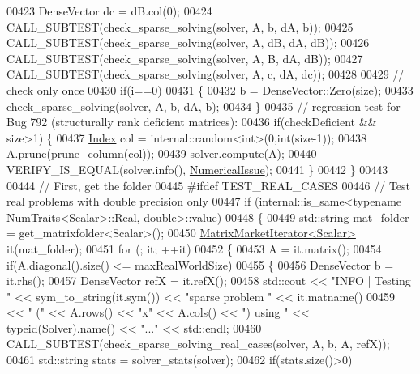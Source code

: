 \begin{DoxyCode}
00423     DenseVector dc = dB.col(0);
00424     CALL\_SUBTEST(check\_sparse\_solving(solver, A, b,  dA, b));
00425     CALL\_SUBTEST(check\_sparse\_solving(solver, A, dB, dA, dB));
00426     CALL\_SUBTEST(check\_sparse\_solving(solver, A, B,  dA, dB));
00427     CALL\_SUBTEST(check\_sparse\_solving(solver, A, c,  dA, dc));
00428     
00429     \textcolor{comment}{// check only once}
00430     \textcolor{keywordflow}{if}(i==0)
00431     \{
00432       b = DenseVector::Zero(size);
00433       check\_sparse\_solving(solver, A, b, dA, b);
00434     \}
00435     \textcolor{comment}{// regression test for Bug 792 (structurally rank deficient matrices):}
00436     \textcolor{keywordflow}{if}(checkDeficient && size>1) \{
00437       \hyperlink{namespace_eigen_a62e77e0933482dafde8fe197d9a2cfde}{Index} col = internal::random<int>(0,int(size-1));
00438       A.prune(\hyperlink{structprune__column}{prune\_column}(col));
00439       solver.compute(A);
00440       VERIFY\_IS\_EQUAL(solver.info(), \hyperlink{group__enums_gga85fad7b87587764e5cf6b513a9e0ee5eaaf9b736d310a664e7729d163a035cc5f}{NumericalIssue});
00441     \}
00442   \}
00443   
00444   \textcolor{comment}{// First, get the folder }
00445 \textcolor{preprocessor}{#ifdef TEST\_REAL\_CASES}
00446   \textcolor{comment}{// Test real problems with double precision only}
00447   \textcolor{keywordflow}{if} (internal::is\_same<\textcolor{keyword}{typename} \hyperlink{group___core___module_struct_eigen_1_1_num_traits}{NumTraits<Scalar>::Real}, \textcolor{keywordtype}{double}>::value)
00448   \{
00449     std::string mat\_folder = get\_matrixfolder<Scalar>();
00450     \hyperlink{class_eigen_1_1_matrix_market_iterator}{MatrixMarketIterator<Scalar>} it(mat\_folder);
00451     \textcolor{keywordflow}{for} (; it; ++it)
00452     \{
00453       A = it.matrix();
00454       \textcolor{keywordflow}{if}(A.diagonal().size() <= maxRealWorldSize)
00455       \{
00456         DenseVector b = it.rhs();
00457         DenseVector refX = it.refX();
00458         std::cout << \textcolor{stringliteral}{"INFO | Testing "} << sym\_to\_string(it.sym()) << \textcolor{stringliteral}{"sparse problem "} << it.matname()
00459                   << \textcolor{stringliteral}{" ("} << A.rows() << \textcolor{stringliteral}{"x"} << A.cols() << \textcolor{stringliteral}{") using "} << \textcolor{keyword}{typeid}(Solver).name() << \textcolor{stringliteral}{"..."} <<
       std::endl;
00460         CALL\_SUBTEST(check\_sparse\_solving\_real\_cases(solver, A, b, A, refX));
00461         std::string stats = solver\_stats(solver);
00462         \textcolor{keywordflow}{if}(stats.size()>0)

\end{DoxyCode}
